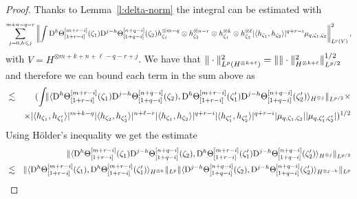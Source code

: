 \begin{proof}
  Thanks to Lemma~\ref{l:delta-norm} the integral can be estimated with
  \[ \sum_{j = 0, h \leqslant j}^{m + n - q - r} \left\| \int \mathrm{D}^h
     \Theta^{[m + r - i]}_{[1 + r - i]} (\zeta_1) \mathrm{D}^{j - h} \Theta_{[1 +
     q - i]}^{[n + q - i]} (\zeta_2) h_{\zeta_1}^{\otimes m - q} \otimes
     h^{\otimes n - r}_{\zeta_2} \otimes h^{\otimes k}_{\zeta_1} \otimes
     h_{\zeta_2}^{\otimes \ell} | \langle h_{\zeta_1}, h_{\zeta_2} \rangle
     |^{q + r - i} \mu_{q, \zeta_1, \zeta_2} \right\|^2_{L^p (V)}, \]
  with $V = H^{\otimes m + k + n + \ell - q - r + j}$. We have that $\|
  \cdot \|_{L^p (H^{\otimes k + \ell})}^2 = \| \| \cdot \|^2_{H^{\otimes k
  + \ell}} \|_{L^{p / 2}}^{1 / 2}$ and therefore we can bound each term in the
  sum above as
  \begin{eqnarray*}
    & \lesssim & (\int_{} \| \langle \mathrm{D}^h \Theta^{[m + r - i]}_{[1 + r -
    i]} (\zeta_1) \mathrm{D}^{j - h} \Theta_{[1 + q - i]}^{[n + q - i]} (\zeta_2),
    \mathrm{D}^h \Theta^{[m + r - i]}_{[1 + r - i]} (\zeta'_1) \mathrm{D}^{j - h}
    \Theta_{[1 + q - i]}^{[n + q - i]} (\zeta'_2) \rangle_{H^{\otimes j}}
    \|_{L^{p / 2}} \times\\
    &  & \times  | \langle h_{\zeta_1}, h_{\zeta_1'} \rangle |^{m +
    k - q} | \langle h_{\zeta_2}, h_{\zeta_2'} \rangle |^{n + \ell - r} |
    \langle h_{\zeta_1}, h_{\zeta_2} \rangle |^{q + r - i} | \langle
    h_{\zeta'_1}, h_{\zeta'_2} \rangle |^{q + r - i} | \mu_{q, \zeta_1,
    \zeta_2} | | \mu_{q, \zeta_1', \zeta_2'} |)^{1 / 2}
  \end{eqnarray*}
  Using H{\"o}lder's inequality we get the estimate
  \begin{eqnarray*}
    &  & \| \langle \mathrm{D}^h \Theta^{[m + r - i]}_{[1 + r - i]} (\zeta_1)
    \mathrm{D}^{j - h} \Theta_{[1 + q - i]}^{[n + q - i]} (\zeta_2), \mathrm{D}^h
    \Theta^{[m + r - i]}_{[1 + r - i]} (\zeta'_1) \mathrm{D}^{j - h} \Theta_{[1 +
    q - i]}^{[n + q - i]} (\zeta'_2) \rangle_{H^{\otimes j}} \|_{L^{p / 2}}\\
    & \lesssim & \| \langle \mathrm{D}^h \Theta^{[m + r - i]}_{[1 + r - i]}
    (\zeta_1), \mathrm{D}^h \Theta^{[m + r - i]}_{[1 + r - i]} (\zeta'_1)
    \rangle_{H^{\otimes h}} \|_{L^p} \| \langle \mathrm{D}^{j - h} \Theta_{[1 + q
    - i]}^{[n + q - i]} (\zeta_2), \mathrm{D}^{j - h} \Theta_{[1 + q - i]}^{[n + q
    - i]} (\zeta'_2) \rangle_{H^{\otimes j - h}} \|_{L^p}
  \end{eqnarray*}
  

\end{proof}
